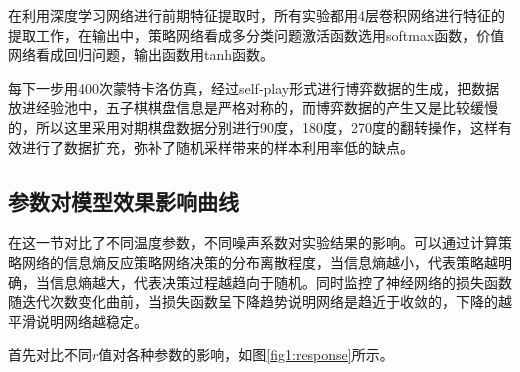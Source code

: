 在利用深度学习网络进行前期特征提取时，所有实验都用4层卷积网络进行特征的提取工作，在输出中，策略网络看成多分类问题激活函数选用softmax函数，价值网络看成回归问题，输出函数用tanh函数。

每下一步用400次蒙特卡洛仿真，经过self-play形式进行博弈数据的生成，把数据放进经验池中，五子棋棋盘信息是严格对称的，而博弈数据的产生又是比较缓慢的，所以这里采用对期棋盘数据分别进行90度，180度，270度的翻转操作，这样有效进行了数据扩充，弥补了随机采样带来的样本利用率低的缺点。

\subsection{参数对模型效果影响曲线}
在这一节对比了不同温度参数，不同噪声系数对实验结果的影响。可以通过计算策略网络的信息熵反应策略网络决策的分布离散程度，当信息熵越小，代表策略越明确，当信息熵越大，代表决策过程越趋向于随机。同时监控了神经网络的损失函数随迭代次数变化曲前，当损失函数呈下降趋势说明网络是趋近于收敛的，下降的越平滑说明网络越稳定。

首先对比不同$r$值对各种参数的影响，如图\ref{fig1:response}所示。





